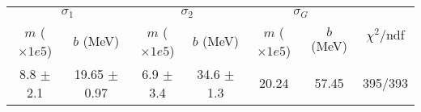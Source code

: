 \begin{tabular}{cc|cc|cc||c}
\multicolumn{2}{c|}{$\sigma_1$} & \multicolumn{2}{|c}{$\sigma_2$} & \multicolumn{2}{|c}{$\sigma_G$}  & \multirow{2}{*}{$\chi^2/$ndf}\\
$m$ ($\times1e5$) & $b$ (MeV) & $m$ ($\times1e5$) & $b$ (MeV) & $m$ ($\times1e5$) & $b$ (MeV) & \\
\hline
8.8 $\pm$ 2.1 & 19.65 $\pm$ 0.97 & 6.9 $\pm$ 3.4 & 34.6 $\pm$ 1.3 & 20.24 & 57.45 & 395/393\\
\end{tabular}

